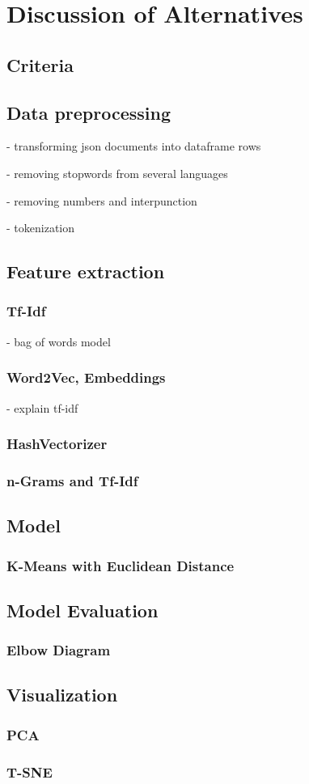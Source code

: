 \chapter{Discussion of Alternatives}
\section{Criteria}

\section{Data preprocessing}
- transforming json documents into dataframe rows

- removing stopwords from several languages

- removing numbers and interpunction

- tokenization

\section{Feature extraction}
\subsection{Tf-Idf}
- bag of words model
\subsection{Word2Vec, Embeddings}
- explain tf-idf
\subsection{HashVectorizer}
\subsection{n-Grams and Tf-Idf}

\section{Model}
\subsection{K-Means with Euclidean Distance}

\section{Model Evaluation}
\subsection{Elbow Diagram}

\section{Visualization}
\subsection{PCA}
\subsection{T-SNE}